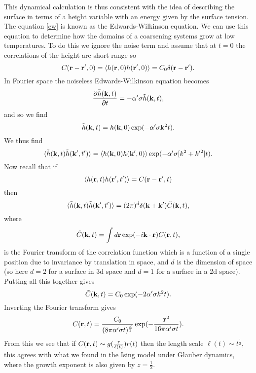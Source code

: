 \documentclass[11pt]{report}
\begin{document}
This dynamical calculation is thus consistent with the idea of describing the surface in terms of a height variable with an energy given by the surface tension. The equation \eqref{ew} is known as the Edwards-Wilkinson equation. We can use this equation to determine how the domains of a coarsening systems grow at low temperatures. To do this we ignore the noise term and assume that at $t=0$ the correlations of the height are short range so
\begin{equation}
C({\bf r}-{\bf r}',0)= \langle h({\bf r},0)h({\bf r}',0)\rangle =C_0 \delta({\bf r}-{\bf r}').
\end{equation}
In Fourier space the noiseless Edwards-Wilkinson equation becomes
\begin{equation}
\frac{\partial\tilde h({\bf k},t)}{\partial t} = -\alpha'\sigma \tilde h({\bf k},t) ,
\end{equation}
and so we find
\begin{equation}
\tilde h({\bf k},t) = h({\bf k},0)\exp(-\alpha'\sigma{\bf k}^2 t).
\end{equation}
We thus find 
\begin{equation}
\langle \tilde h({\bf k},t)\tilde h({\bf k}',t')\rangle = \langle h({\bf k},0)h({\bf k}',0)\rangle \exp(-\alpha'\sigma[k^2+k'^2] t).
\end{equation}
Now recall that if 
\begin{equation}
\langle  h({\bf r},t) h({\bf r}',t')\rangle =C({\bf r}-{\bf r}',t)
\end{equation}
then
\begin{equation}
\langle \tilde h({\bf k},t)\tilde h({\bf k}',t')\rangle= (2\pi)^d \delta({\bf k}+{\bf k}') \tilde C({\bf k},t),
\end{equation}
where 
\begin{equation}
\tilde C({\bf k},t)= \int d{\bf r} \exp(-i{\bf k}\cdot {\bf r})C({\bf r},t),
\end{equation}
is the Fourier transform of the correlation function which is a function of a single position due to invariance by translation in space, and $d$ is the dimension of space (so here $d=2$ for a surface in 3d space and $d=1$ for a surface in a 2d space). Putting all this together gives
\begin{equation}
\tilde C({\bf k},t)= C_0 \exp(-2\alpha'\sigma k^2 t).
\end{equation}
Inverting the Fourier transform gives
\begin{equation}
C({\bf r},t)= \frac{C_0}{(8\pi \alpha'\sigma t)^{\frac{d}{2}}} \exp(-\frac{{\bf r}^2}{16\pi \alpha'\sigma t}).
\end{equation}
From this we see that if $C({\bf r},t)\sim g(\frac{{\bf r}}{\ell(t)})r(t)$ then the length scale $\ell(t)\sim t^{\frac{1}{2}}$, this agrees with what we found in the Ising model under Glauber dynamics, where the growth exponent is also given by $z=\frac{1}{2}$.
\\
\end{document}
